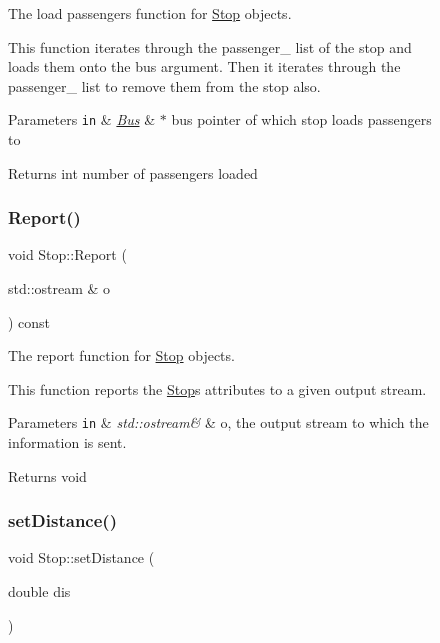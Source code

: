 \begin{figure}[H]
\begin{center}
The load passengers function for \hyperlink{classStop}{Stop} objects. 

This function iterates through the passenger\+\_\+ list of the stop and loads them onto the bus argument. Then it iterates through the passenger\+\_\+ list to remove them from the stop also.


\begin{DoxyParams}[1]{Parameters}
\mbox{\tt in}  & {\em \hyperlink{classBus}{Bus}} & $\ast$ bus pointer of which stop loads passengers to\\
\hline
\end{DoxyParams}
\begin{DoxyReturn}{Returns}
int number of passengers loaded 
\end{DoxyReturn}
\mbox{\label{classStop_a8e286b7cca2dce6977ebda6f01805d94}} 
\subsubsection{\texorpdfstring{Report()}{Report()}}
{\footnotesize\ttfamily void Stop\+::\+Report (\begin{DoxyParamCaption}\item[{std\+::ostream \&}]{o }\end{DoxyParamCaption}) const}



The report function for \hyperlink{classStop}{Stop} objects. 

This function reports the \hyperlink{classStop}{Stop}\textquotesingle{}s attributes to a given output stream.


\begin{DoxyParams}[1]{Parameters}
\mbox{\tt in}  & {\em std\+::ostream\&} & o, the output stream to which the information is sent.\\
\hline
\end{DoxyParams}
\begin{DoxyReturn}{Returns}
void 
\end{DoxyReturn}
\mbox{\label{classStop_af26acbcbca66d3a36ce01bc662e2e892}} 
\subsubsection{\texorpdfstring{set\+Distance()}{setDistance()}}
{\footnotesize\ttfamily void Stop\+::set\+Distance (\begin{DoxyParamCaption}\item[{double}]{dis }\end{DoxyParamCaption})}




\end{center}
\end{figure}
